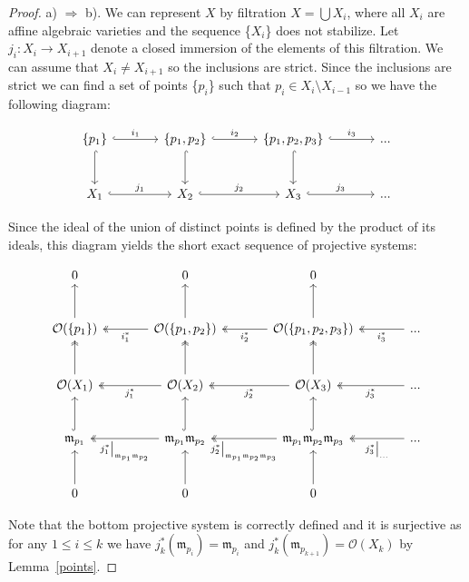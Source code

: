 \documentclass[a4paper,draft,reqno,12pt]{amsart}
\theoremstyle{definition}
\theoremstyle{remark}
\def\mf{\mathfrak{m}}
\begin{document}
\begin{proof}
    a) $\Rightarrow$ b). We can represent $X$ by filtration $X = \bigcup X_i$, where all $X_i$ are affine algebraic varieties and the sequence \{$X_i$\} does not stabilize. Let $j_i: X_i \to X_{i+1}$ denote a closed immersion of the elements of this filtration. We can assume that $X_i \neq X_{i+1}$ so the inclusions are strict. Since the inclusions are strict we can find a set of points \{$p_i$\} such that $p_i \in X_i \setminus X_{i-1}$ so we have the following diagram:
    
    \[ \begin{tikzcd}[sep=large]
    \{p_1\} \arrow[hook]{r}{i_1} \arrow[hook]{d} & \{p_1, p_2\} \arrow[hook]{r}{i_2} \arrow[hook]{d} & \{p_1, p_2, p_3\} \arrow[hook]{r}{i_3} \arrow[hook]{d} & ...\\%
    X_1 \arrow[hook]{r}{j_1} & X_2 \arrow[hook]{r}{j_2} & X_3 \arrow[hook]{r}{j_3} & ...
    \end{tikzcd}
    \]
    
    Since the ideal of the union of distinct points is defined by the product of its ideals, this diagram yields the short exact sequence of projective systems:
    
    \[ \begin{tikzcd}[sep=large]
    0 & 0 & 0\\%
    \mathcal{O}(\{p_1\}) \arrow{u} & \mathcal{O}(\{p_1, p_2\}) \arrow[two heads]{l}{i_1^{*}} \arrow{u} & \mathcal{O}(\{p_1, p_2, p_3\}) \arrow[two heads]{l}{i_2^{*}} \arrow{u} & \arrow[two heads]{l}{i_3^{*}} ...\\%
    \mathcal{O}(X_1) \arrow[two heads]{u} & \mathcal{O}(X_2) \arrow[two heads]{u} \arrow[two heads]{l}{j_1^{*}} & \mathcal{O}(X_3) \arrow[two heads]{u} \arrow[two heads]{l}{j_2^{*}} & \arrow[two heads]{l}{j_3^{*}} ...\\%
    \mf_{p_1} \arrow[hook]{u} & \mf_{p_1}\mf_{p_2} \arrow[hook]{u} \arrow[two heads]{l}{j_1^{*}{\big|}_{\mf_{p_1}\mf_{p_2}}} & \mf_{p_1}\mf_{p_2}\mf_{p_3} \arrow[two heads]{l}{j_2^{*}{\big|}_{\mf_{p_1}\mf_{p_2}\mf_{p_3}}} \arrow[hook]{u} & \arrow[two heads]{l}{j_3^{*}{\big|}_{...}} ...\\%
    0 \arrow{u} & 0 \arrow{u} & 0 \arrow{u}
    \end{tikzcd}
    \]
    
    Note that the bottom projective system is correctly defined and it is surjective as for any $1 \leq i \leq k$ we have $j_k^{*}(\mf_{p_i}) = \mf_{p_i}$ and $j_k^{*}(\mf_{p_{k+1}}) = \mathcal{O}(X_k)$ by Lemma~\ref{points}.


\end{proof}
\end{document}
